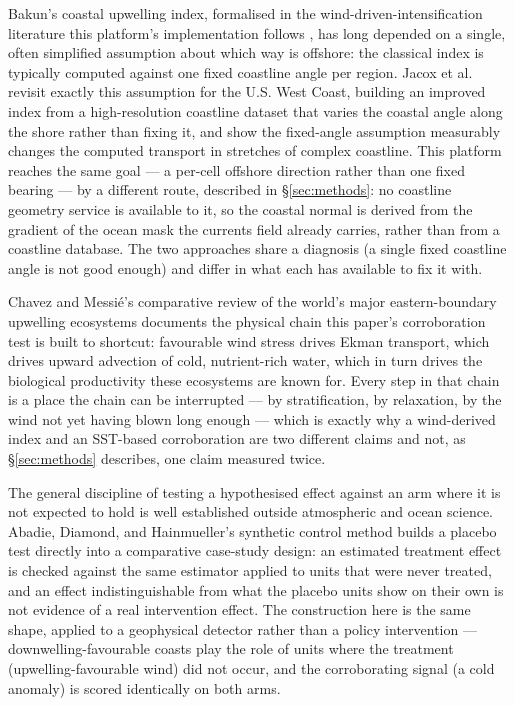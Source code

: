  Bakun's coastal upwelling
index, formalised in the wind-driven-intensification literature this
platform's implementation follows \citep{bakun1990}, has long depended on a
single, often simplified assumption about which way is offshore: the
classical index is typically computed against one fixed coastline angle per
region. Jacox et al.\ \citep{jacox2018} revisit exactly this assumption for
the U.S. West Coast, building an improved index from a high-resolution
coastline dataset that varies the coastal angle along the shore rather than
fixing it, and show the fixed-angle assumption measurably changes the
computed transport in stretches of complex coastline. This platform reaches
the same goal --- a per-cell offshore direction rather than one fixed
bearing --- by a different route, described in \S\ref{sec:methods}: no
coastline geometry service is available to it, so the coastal normal is
derived from the gradient of the ocean mask the currents field already
carries, rather than from a coastline database. The two approaches share a
diagnosis (a single fixed coastline angle is not good enough) and differ in
what each has available to fix it with.

 Chavez and
Messi\'e's comparative review of the world's major eastern-boundary
upwelling ecosystems \citep{chavez2009} documents the physical chain this
paper's corroboration test is built to shortcut: favourable wind stress
drives Ekman transport, which drives upward advection of cold, nutrient-rich
water, which in turn drives the biological productivity these ecosystems are
known for. Every step in that chain is a place the chain can be interrupted
--- by stratification, by relaxation, by the wind not yet having blown long
enough --- which is exactly why a wind-derived index and an SST-based
corroboration are two different claims and not, as \S\ref{sec:methods}
describes, one claim measured twice.

 The
general discipline of testing a hypothesised effect against an arm where it
is not expected to hold is well established outside atmospheric and ocean
science. Abadie, Diamond, and Hainmueller's synthetic control method
\citep{abadie2010} builds a placebo test directly into a comparative
case-study design: an estimated treatment effect is checked against the same
estimator applied to units that were never treated, and an effect
indistinguishable from what the placebo units show on their own is not
evidence of a real intervention effect. The construction here is the same
shape, applied to a geophysical detector rather than a policy intervention
--- downwelling-favourable coasts play the role of units where the treatment
(upwelling-favourable wind) did not occur, and the corroborating signal
(a cold anomaly) is scored identically on both arms.

